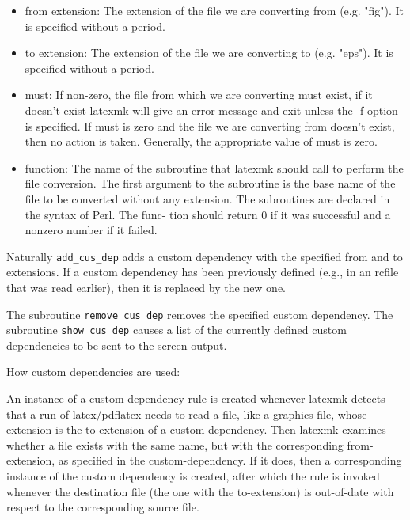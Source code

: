 \begin{itemize}
       \item from extension:
							The extension of the file we are converting from  (e.g.  "fig").
							It is specified without a period.

       \item to extension:
							The extension of the file we are converting to (e.g. "eps").  It
							is specified without a period.

			 \item must:  If non-zero, the file from which we are converting  must
							 exist, if  it doesn't exist latexmk will give an error message
							 and exit unless the -f option is specified.  If must is zero and
							 the file we  are  converting from doesn't exist, then no action
							 is taken.  Generally, the appropriate value of must is zero.

       \item function:
							The name of the subroutine that latexmk should call  to  perform
							the  file  conversion.   The first argument to the subroutine is
							the base name of the file to be converted without any extension.
							The  subroutines  are declared in the syntax of Perl.  The func-
							tion should return 0 if it was successful and a  nonzero  number
							if it failed.
\end{itemize}

Naturally  \verb|add_cus_dep| adds a custom dependency with the specified from
and to extensions.  If a custom dependency has been previously  defined
(e.g.,  in an rcfile that was read earlier), then it is replaced by the
new one.

The subroutine \verb|remove_cus_dep| removes the specified custom  dependency.
The subroutine \verb|show_cus_dep| causes a list of the currently defined
custom dependencies to be sent to the screen output.

How custom dependencies are used:

An instance of a custom dependency rule is created whenever latexmk detects
that a run of latex/pdflatex needs to read a file, like a graphics file, whose
extension is the to-extension of a  custom  dependency.  Then  latexmk examines
whether  a file exists with the same name, but with the corresponding
from-extension, as specified in  the  custom-dependency.   If it does, then a
corresponding instance of the custom dependency is created, after which the
rule is invoked whenever the  destination  file  (the one with the
to-extension) is out-of-date with respect to the corresponding source file.

